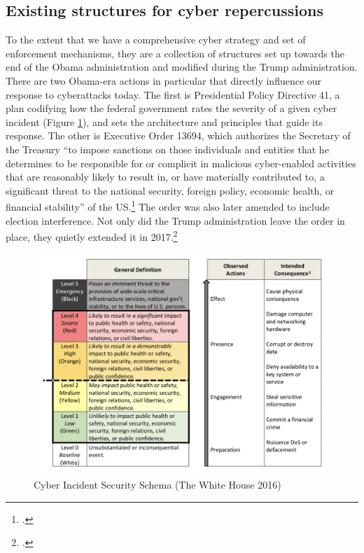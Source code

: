 \documentclass{memoir}
\begin{document}
\begin{refsegment}
\subsection{Existing structures for cyber repercussions}
To the extent that we have a comprehensive cyber strategy and set of enforcement mechanisms, they are a collection of structures set up towards the end of the Obama administration and modified during the Trump administration. There are two Obama-era actions in particular that directly influence our response to cyberattacks today.
The first is Presidential Policy Directive 41, a plan codifying how the federal government rates the severity of a given cyber incident (Figure \ref{severity-schema}), and sets the architecture and principles that guide its response. The other is Executive Order 13694, which authorizes the Secretary of the Treasury ``to impose sanctions on those individuals and entities that he determines to be responsible for or complicit in malicious cyber-enabled activities that are reasonably likely to result in, or have materially contributed to, a significant threat to the national security, foreign policy, economic health, or financial stability'' of the US.\footcite{daniel_our_2015} The order was also later amended to include election interference. Not only did the Trump administration leave the order in place, they quietly extended it in 2017.\footcite{uchill_white_2017}

\begin{figure}
\centering
\includegraphics[scale=0.53]{severity-schema.png}
\caption{Cyber Incident Security Schema (The White House 2016)}
\label{severity-schema}
\end{figure}


\end{refsegment}
\end{document}
